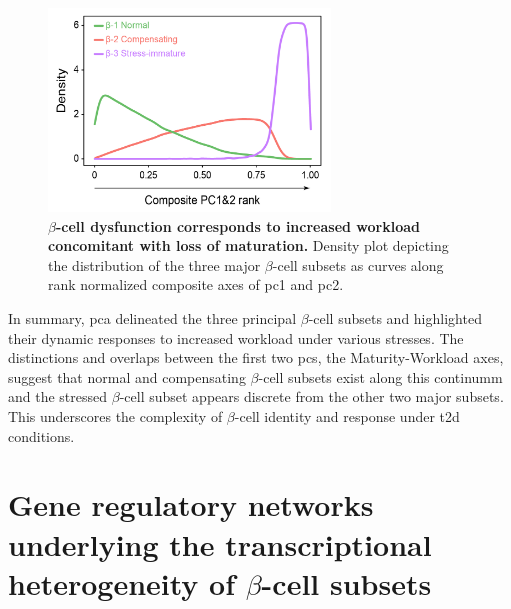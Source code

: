 

\begin{figure}
\vspace{-20pt}
\includegraphics[width=7.5cm]{Chapter5/Fig/F3-6-04.png}
\caption[$\beta$-cell dysfunction corresponds to increased workload and loss of maturation]{\textbf{$\beta$-cell dysfunction corresponds to increased workload concomitant with loss of maturation.}  Density plot depicting the distribution of the three major $\beta$-cell subsets as curves along rank normalized composite axes of \gls{pc}1 and \gls{pc}2.}
\label{fig:chp3_pca2}
\vspace{-15pt}
\end{figure}

\par In summary, \gls{pca} delineated the three principal $\beta$-cell subsets and highlighted their dynamic responses to increased workload under various stresses. The distinctions and overlaps between the first two \glspl{pc}, the Maturity-Workload axes, suggest that normal and compensating $\beta$-cell subsets exist along this continumm and the stressed $\beta$-cell subset appears discrete from the other two major subsets. This underscores the complexity of $\beta$-cell identity and response under \gls{t2d} conditions.  


\section[\glsentryshort{grn}s underlying the transcriptional heterogeneity of $\beta$-cell subsets]{Gene regulatory networks underlying the transcriptional\\heterogeneity of $\beta$-cell subsets}
\label{sec:chp3_betaGRN}


